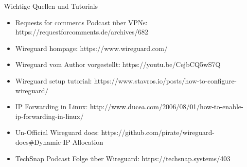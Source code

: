\documentclass{beamer}
\begin{document}
  \begin{frame}{Wichtige Quellen und Tutorials}
    \begin{itemize}
      \item Requests for comments Podcast über VPNs: https://requestforcomments.de/archives/682
      \item Wireguard hompage: https://www.wireguard.com/
      \item Wireguard vom Author vorgestellt: https://youtu.be/CejbCQ5wS7Q
      \item Wireguard setup tutorial: https://www.stavros.io/posts/how-to-configure-wireguard/
      \item IP Forwarding in Linux: http://www.ducea.com/2006/08/01/how-to-enable-ip-forwarding-in-linux/
      \item Un-Official Wireguard docs: https://github.com/pirate/wireguard-docs#Dynamic-IP-Allocation
      \item TechSnap Podcast Folge über Wireguard: https://techsnap.systems/403
    \end{itemize}
  \end{frame}
  




  
  

\end{document}
